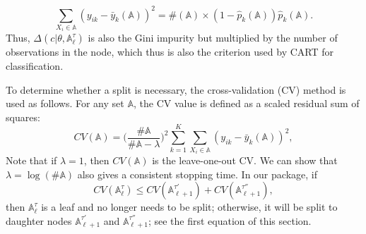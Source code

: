$$
\sum_{X_i \in \mathbb{A}} (y_{ik} -  \bar y_k(\mathbb{A}))^2  = \#( \mathbb{A}) \times  (1- \hat  p_k(\mathbb{A}))  \hat p_k(\mathbb{A}).
$$
Thus, $ \Delta(c|\theta, \mathbb{A}_\ell^\tau) $ is also the Gini impurity but multiplied by the number of observations in the node, which thus is also the criterion used by CART for classification.  %

To determine whether a split is necessary, the cross-validation (CV) method is used as follows. For any set $ \mathbb{A} $, the CV value is defined as a scaled residual sum of squares:
$$
CV(\mathbb{A}) = \Big(\frac{\#\mathbb{A}}{\#\mathbb{A} -\lambda}\Big)^2 \sum_{k=1}^K \sum_{X_i \in  \mathbb{A}} ( y_{ik} - \bar y_k(\mathbb{A}))^2,
$$
Note that if $ \lambda = 1 $, then $ CV(\mathbb{A}) $ is the leave-one-out CV. We can show that $ \lambda = \log(\#\mathbb{A}) $ also gives a consistent stopping time.  In our package,  if
$$ CV(\mathbb{A}_\ell^\tau ) \le CV(\mathbb{A}_{\ell+1}^{\tau'}) + CV(\mathbb{A}_{\ell+1}^{\tau''}), $$
then $ \mathbb{A}_\ell^\tau $ is a leaf and no longer needs to be split; otherwise, it will be split to daughter nodes $ \mathbb{A}_{\ell+1}^{\tau'} $ and $ \mathbb{A}_{\ell+1}^{\tau''} $; see the first equation of this section.%


